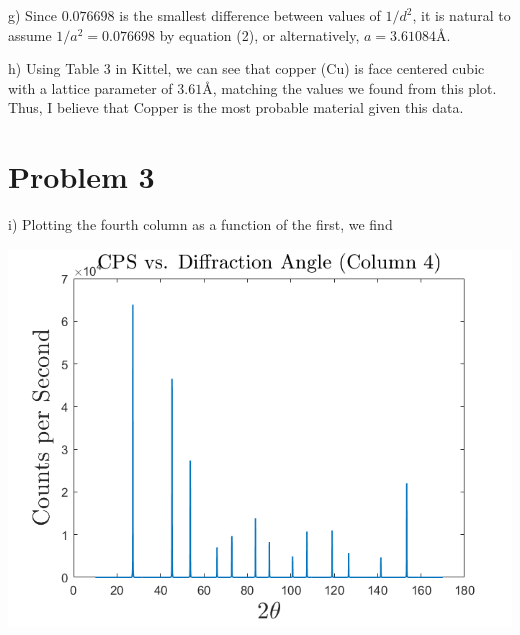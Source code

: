 \documentclass{article}
\begin{document}
g) Since $0.076698$ is the smallest difference between values of $1/d^2$, it is natural to assume $1/a^2 = 0.076698$ by equation (2), or alternatively, $a = 3.61084 \text{\AA}$.
\newline

h) Using Table 3 in Kittel, we can see that copper (Cu) is face centered cubic with a lattice parameter of $3.61 \text{\AA}$, matching the values we found from this plot. Thus, I believe that Copper is the most probable material given this data.





\section*{Problem 3}
i) Plotting the fourth column as a function of the first, we find
\begin{center}
    \includegraphics[scale = 0.75]{column4.png}
\end{center}
\end{document}
